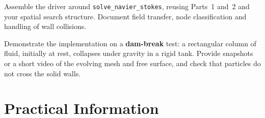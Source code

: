 \documentclass[11pt,a4paper]{article}
\begin{document}
\begin{task}
Assemble the driver around \lstinline{solve_navier_stokes}, reusing
Parts~1 and~2 and your spatial search structure. Document field transfer,
node classification and handling of wall collisions.
\end{task}

\begin{task}
Demonstrate the implementation on a \textbf{dam-break} test: a rectangular
column of fluid, initially at rest, collapses under gravity in a rigid
tank. Provide snapshots or a short video of the evolving mesh and free
surface, and check that particles do not cross the solid walls.
\end{task}



\section*{Practical Information}
\end{document}
